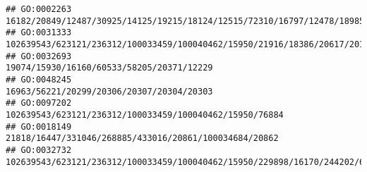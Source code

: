 \documentclass[
]{article}
\begin{document}
\begin{verbatim}
## GO:0002263                                                                                                                                                                                                                                           16182/20849/12487/30925/14125/19215/18124/12515/72310/16797/12478/18985/16160/20556/12775/16364/17079/13421/321019/12458/57757/15000/14999/16149/14126/20371/12229
## GO:0031333                                                                                                                                                                                                                                                                                 102639543/623121/236312/100033459/100040462/15950/21916/18386/20617/20128/50876/327959/20259/20741/54483/224762/22153/225288
## GO:0032693                                                                                                                                                                                                                                                                                                                                                                    19074/15930/16160/60533/58205/20371/12229
## GO:0048245                                                                                                                                                                                                                                                                                                                                                                    16963/56221/20299/20306/20307/20304/20303
## GO:0097202                                                                                                                                                                                                                                                                                                                                                      102639543/623121/236312/100033459/100040462/15950/76884
## GO:0018149                                                                                                                                                                                                                                                                                                                                                       21818/16447/331046/268885/433016/20861/100034684/20862
## GO:0032732                                                                                                                                                                                                                                                                                                                     102639543/623121/236312/100033459/100040462/15950/229898/16170/244202/637515/12775/54483

\end{verbatim}
\end{document}
